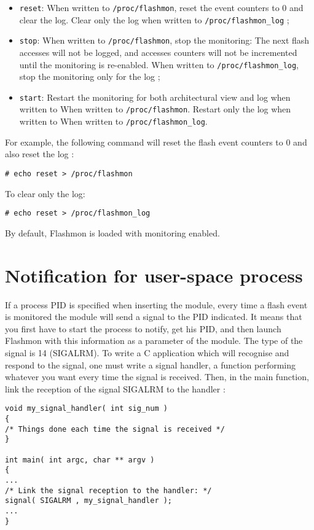 \documentclass[11pt]{article}
\begin{document}
\begin{itemize}
  \item \verb+reset+: When written to \verb+/proc/flashmon+, reset the event counters to 0 and clear the log. Clear only the log when written to \verb+/proc/flashmon_log+ ;
  \item \verb+stop+: When written to \verb+/proc/flashmon+, stop the monitoring: The next flash accesses will not be logged, and accesses counters will not be incremented until the monitoring is re-enabled. When written to \verb+/proc/flashmon_log+, stop the monitoring only for the log ;
  \item \verb+start+: Restart the monitoring for both architectural view and log when written to When written to \verb+/proc/flashmon+. Restart only the log when written to When written to \verb+/proc/flashmon_log+.
\end{itemize}

For example, the following command will reset the flash event counters to 0 and also reset the log :

\begin{verbatim}
# echo reset > /proc/flashmon
\end{verbatim}

To clear only the log:

\begin{verbatim}
# echo reset > /proc/flashmon_log
\end{verbatim}

By default, Flashmon is loaded with monitoring enabled.

\section{Notification for user-space process}
If a process PID is specified when inserting the module, every time a flash event is monitored the module will send a signal to the PID indicated. It means that you first have to start the process to notify, get his PID, and then launch Flashmon with this information as a parameter of the module. The type of the signal is 14 (SIGALRM).
To write a C application which will recognise and respond to the signal, one must write a signal handler, a function performing whatever you want every time the signal is received. Then, in the main function, link the reception of the signal SIGALRM to the handler :

\begin{verbatim}
void my_signal_handler( int sig_num )
{
/* Things done each time the signal is received */
}

int main( int argc, char ** argv )
{
...
/* Link the signal reception to the handler: */
signal( SIGALRM , my_signal_handler );
...
}
\end{verbatim}
\end{document}
